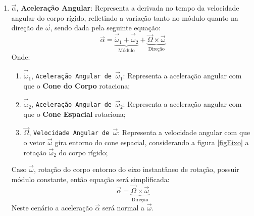 \documentclass{article}
\begin{document}
                \begin{enumerate}[rightmargin = \leftmargin]
                    \item $\vec{\alpha}$, \textbf{Aceleração Angular}: Representa a derivada no tempo da velocidade angular do corpo rígido, refletindo a variação tanto no módulo quanto na direção de $\vec{\omega}$, sendo dada pela seguinte equação:
                        \begin{equation}
                            \boxed{
                                \vec{\alpha} = 
                                \underbrace{
                                    \vec{\dot{\omega}}_{1} +
                                    \vec{\dot{\omega}}_{2} 
                                }_{\text{Módulo}} +
                                \underbrace{
                                    \vec{\Omega}\times\vec{\omega}
                                }_{\text{Direção}}
                            }\label{eq.angularAceleration}
                        \end{equation}
                    Onde:
                        \begin{enumerate}[rightmargin = \leftmargin]
                            \item $\vec{\dot{\omega}}_{1}$, \texttt{Aceleração Angular de $\vec{\omega}_{1}$}: Representa a aceleração angular com que o \textbf{Cone do Corpo} rotaciona;

                            \item $\vec{\dot{\omega}}_{2}$, \texttt{Aceleração Angular de $\vec{\omega}_{2}$}: Representa a aceleração angular com que o \textbf{Cone Espacial} rotaciona;

                            \item $\vec{\Omega}$, \texttt{Velocidade Angular de $\vec{\omega}$}: Representa a velocidade angular com que o vetor $\vec{\omega}$ gira entorno do cone espacial, considerando a figura \ref{figEixo} a rotação $\vec{\omega}_{2}$ do corpo rígido;
                        \end{enumerate}
                    Caso $\vec{\omega}$, rotação do corpo entorno do eixo instantâneo de rotação, possuir módulo constante, então equação será simplificada:
                        \begin{equation}
                            \boxed{
                                \vec{\alpha} = 
                                \underbrace{
                                    \vec{\Omega}\times\vec{\omega}
                                }_{\text{Direção}}
                            }
                        \end{equation}
                    Neste cenário a aceleração $\vec{\alpha}$ será normal a $\vec{\omega}$.
                \end{enumerate}
\newpage
\end{document}
